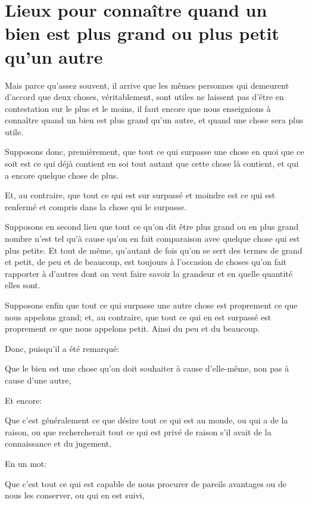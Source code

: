 
\section{Lieux pour connaître quand un bien est plus grand ou plus petit qu'un autre}

Mais parce qu'assez souvent, il arrive que les mêmes personnes qui demeurent d'accord que deux choses,
véritablement, sont utiles ne laissent pas d'être en contestation sur le plus et le moins, il faut encore
que nous enseignions à connaître quand un bien est plus grand qu'un autre, et quand une chose sera plus
utile. 

Supposons donc, premièrement, que tout ce qui surpasse une chose en quoi que ce soit est ce qui déjà contient
en soi tout autant que cette chose là contient, et qui a encore quelque chose de plus.

Et, au contraire, que tout ce qui est sur surpassé et moindre est ce qui est renfermé et compris dans la chose
qui le surpasse.

Supposons en second lieu que tout ce qu'on dit être plus grand ou en plus grand nombre n'est tel qu'à cause
qu'on en fait comparaison avec quelque chose qui est plus petite. Et tout de même, qu'autant de fois qu'on
se sert des termes de grand et petit, de peu et de beaucoup, est toujours à l'occasion de choses qu'on fait
rapporter à d'autres dont on veut faire savoir la grandeur et en quelle quantité elles sont.

Supposons enfin que tout ce qui surpasse une autre chose est proprement ce que nous appelons grand; et, au
contraire, que tout ce qui en est surpassé est proprement ce que nous appelons petit. Ainsi du peu et du
beaucoup.

\bigbreak

Donc, puisqu'il a été remarqué:

\begin{emphpar}
    Que le bien est une chose qu'on doit souhaiter à cause d'elle-même, non pas à cause d'une autre,
\end{emphpar}

Et encore:

\begin{emphpar}
    Que c'est généralement ce que désire tout ce qui est au monde, ou qui a de la raison, ou que rechercherait
	tout ce qui est privé de raison s'il avait de la connaissance et du jugement,
\end{emphpar}

En un mot:

\begin{emphpar}
    Que c'est tout ce qui est capable de nous procurer de pareils avantages ou de nous les conserver, ou qui
	en est suivi,
\end{emphpar}

